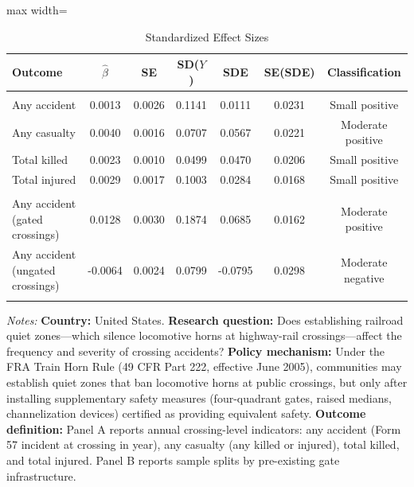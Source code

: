 \begin{table}[t]
\centering
\caption{Standardized Effect Sizes}
\label{tab:sde}
\begin{adjustbox}{max width=\textwidth}
\begin{tabular}{lcccccc}
\hline\hline
Outcome & $\hat{\beta}$ & SE & SD($Y$) & SDE & SE(SDE) & Classification \\
\hline
\addlinespace
\multicolumn{7}{l}{\textit{Panel A: Pooled}} \\
\addlinespace
Any accident & 0.0013 & 0.0026 & 0.1141 & 0.0111 & 0.0231 & Small positive \\
Any casualty & 0.0040 & 0.0016 & 0.0707 & 0.0567 & 0.0221 & Moderate positive \\
Total killed & 0.0023 & 0.0010 & 0.0499 & 0.0470 & 0.0206 & Small positive \\
Total injured & 0.0029 & 0.0017 & 0.1003 & 0.0284 & 0.0168 & Small positive \\
\addlinespace
\multicolumn{7}{l}{\textit{Panel B: Heterogeneous (sample splits by gate infrastructure)}} \\
\addlinespace
Any accident (gated crossings) & 0.0128 & 0.0030 & 0.1874 & 0.0685 & 0.0162 & Moderate positive \\
Any accident (ungated crossings) & -0.0064 & 0.0024 & 0.0799 & -0.0795 & 0.0298 & Moderate negative \\
\addlinespace
\hline\hline
\end{tabular}
\end{adjustbox}
\par\vspace{0.3em}
\begin{minipage}{\textwidth}
\footnotesize
\textit{Notes:}
\textbf{Country:} United States.
\textbf{Research question:} Does establishing railroad quiet zones---which silence locomotive horns at highway-rail crossings---affect the frequency and severity of crossing accidents?
\textbf{Policy mechanism:} Under the FRA Train Horn Rule (49 CFR Part 222, effective June 2005), communities may establish quiet zones that ban locomotive horns at public crossings, but only after installing supplementary safety measures (four-quadrant gates, raised medians, channelization devices) certified as providing equivalent safety.
\textbf{Outcome definition:} Panel A reports annual crossing-level indicators: any accident (Form 57 incident at crossing in year), any casualty (any killed or injured), total killed, and total injured. Panel B reports sample splits by pre-existing gate infrastructure.

\end{minipage}
\end{table}
